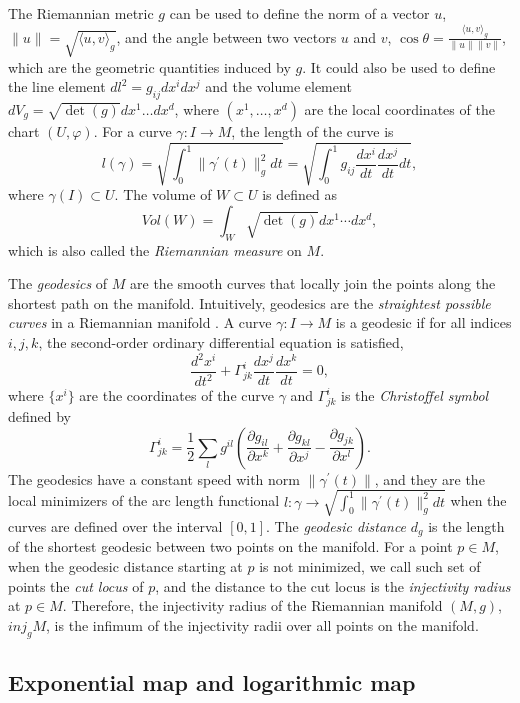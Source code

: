 \documentclass[11pt,a4paper,]{article}
\begin{document}
The Riemannian metric \(g\) can be used to define the norm of a vector \(u\), \(\|u\| = \sqrt{\langle u,v \rangle_g}\), and the angle between two vectors \(u\) and \(v\), \(\cos\theta = \frac{\langle u,v \rangle_g}{\|u\| \|v\|}\), which are the geometric quantities induced by \(g\). It could also be used to define the line element \(dl^2 = g_{ij}dx^i dx^j\) and the volume element \(dV_g = \sqrt{\det(g)}dx^1 \dots dx^d\), where \((x^1,\dots,x^d)\) are the local coordinates of the chart \((U, \varphi)\).
For a curve \(\gamma: I \rightarrow M\), the length of the curve is
\[
l(\gamma) = \sqrt{\int_0^1 \|\gamma^\prime(t)\|^2_g dt} = \sqrt{\int_0^1 g_{ij} \frac{dx^i}{dt} \frac{dx^j}{dt} dt},
\]
where \(\gamma(I) \subset U\). The volume of \(W \subset U\) is defined as
\[
Vol(W) = \int_W \sqrt{\det(g)}dx^1 \cdots dx^d,
\]
which is also called the \emph{Riemannian measure} on \(M\).

The \emph{geodesics} of \(M\) are the smooth curves that locally join the points along the shortest path on the manifold. Intuitively, geodesics are the \emph{straightest possible curves} in a Riemannian manifold \autocite[Section 7.2.3 of][]{Nakahara2018-zs}.
A curve \(\gamma: I \rightarrow M\) is a geodesic if for all indices \(i,j,k\), the second-order ordinary differential equation is satisfied,
\[
\frac{d^2 x^i}{dt^2} + \Gamma^i_{jk} \frac{d x^j}{dt} \frac{dx^k}{dt} = 0,
\]
where \(\{x^i\}\) are the coordinates of the curve \(\gamma\) and \(\Gamma^i_{jk}\) is the \emph{Christoffel symbol} defined by
\[
\Gamma^i_{jk} = \frac{1}{2} \sum_l g^{il} (\frac{\partial g_{il}}{\partial x^k} 
+ \frac{\partial g_{kl}}{\partial x^j} - \frac{\partial g_{jk}}{\partial x^l}).
\]
The geodesics have a constant speed with norm \(\| \gamma^\prime(t) \|\), and they are the local minimizers of the arc
length functional \(l:\gamma \rightarrow \sqrt{\int_0^1 \| \gamma^\prime(t) \|_g^2 dt}\) when the curves are defined over the interval \([0,1]\).
The \emph{geodesic distance} \(d_g\) is the length of the shortest geodesic between two points on the manifold. For a point \(p \in M\), when the geodesic distance starting at \(p\) is not minimized, we call such set of points the \emph{cut locus} of \(p\), and the distance to the cut locus is the \emph{injectivity radius} at \(p \in M\). Therefore, the injectivity radius of the Riemannian manifold \((M,g)\), \(\textit{inj}_gM\), is the infimum of the injectivity radii over all points on the manifold.

\hypertarget{exponential-map-and-logarithmic-map}{%
\subsection{Exponential map and logarithmic map}\label{exponential-map-and-logarithmic-map}}
\end{document}
